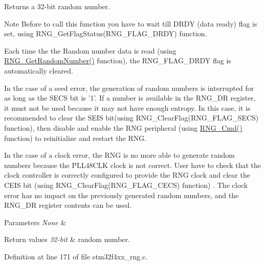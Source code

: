 Returns a 32-\/bit random number. 

\begin{DoxyNote}{Note}
Before to call this function you have to wait till D\-R\-D\-Y (data ready) flag is set, using R\-N\-G\-\_\-\-Get\-Flag\-Status(\-R\-N\-G\-\_\-\-F\-L\-A\-G\-\_\-\-D\-R\-D\-Y) function. 

Each time the the Random number data is read (using \hyperlink{group___r_n_g_ga2cead4780224fd74a3fc15543c98ed36}{R\-N\-G\-\_\-\-Get\-Random\-Number()} function), the R\-N\-G\-\_\-\-F\-L\-A\-G\-\_\-\-D\-R\-D\-Y flag is automatically cleared. 

In the case of a seed error, the generation of random numbers is interrupted for as long as the S\-E\-C\-S bit is '1'. If a number is available in the R\-N\-G\-\_\-\-D\-R register, it must not be used because it may not have enough entropy. In this case, it is recommended to clear the S\-E\-I\-S bit(using R\-N\-G\-\_\-\-Clear\-Flag(\-R\-N\-G\-\_\-\-F\-L\-A\-G\-\_\-\-S\-E\-C\-S) function), then disable and enable the R\-N\-G peripheral (using \hyperlink{group___r_n_g_ga6c1a8372da6e8a06819903c63faecd7b}{R\-N\-G\-\_\-\-Cmd()} function) to reinitialize and restart the R\-N\-G. 

In the case of a clock error, the R\-N\-G is no more able to generate random numbers because the P\-L\-L48\-C\-L\-K clock is not correct. User have to check that the clock controller is correctly configured to provide the R\-N\-G clock and clear the C\-E\-I\-S bit (using R\-N\-G\-\_\-\-Clear\-Flag(\-R\-N\-G\-\_\-\-F\-L\-A\-G\-\_\-\-C\-E\-C\-S) function) . The clock error has no impact on the previously generated random numbers, and the R\-N\-G\-\_\-\-D\-R register contents can be used.
\end{DoxyNote}

\begin{DoxyParams}{Parameters}
{\em None} & \\
\hline
\end{DoxyParams}

\begin{DoxyRetVals}{Return values}
{\em 32-\/bit} & random number. \\
\hline
\end{DoxyRetVals}


Definition at line 171 of file stm32f4xx\-\_\-rng.\-c.

